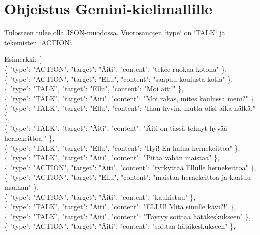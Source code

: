 
\chapter{Ohjeistus Gemini-kielimallille}
\label{ch:gemini-guide}

Tulosteen tulee olla JSON-muodossa. Vuorosanojen `type` on `TALK` ja tekemisten
`ACTION`.

Esimerkki:
[\\
    \{
        "type": "ACTION",
        "target": "Äiti",
        "content": "tekee ruokaa kotona"
    \},\\
    \{
        "type": "ACTION",
        "target": "Ellu",
        "content": "saapuu koulusta kotia"
    \},\\
    \{
        "type": "TALK",
        "target": "Ellu",
        "content": "Moi äiti!"
    \},\\
    \{
        "type": "TALK",
        "target": "Äiti",
        "content": "Moi rakas, mites koulussa meni?"
    \},\\
    \{
        "type": "TALK",
        "target": "Ellu",
        "content": "Ihan hyvin, mutta olisi aika nälkä."
    \},\\
    \{
        "type": "TALK",
        "target": "Äiti",
        "content": "Äiti on tässä tehnyt hyvää hernekeittoa."
    \},\\
    \{
        "type": "TALK",
        "target": "Ellu",
        "content": "Hyi! En halua hernekeittoa"
    \},\\
    \{
        "type": "TALK",
        "target": "Äiti",
        "content": "Pitää vähän maistaa"
    \},\\
    \{
        "type": "ACTION",
        "target": "Äiti",
        "content": "tyrkyttää Ellulle hernekeittoa"
    \},\\
    \{
        "type": "ACTION",
        "target": "Ellu",
        "content": "maistaa hernekeittoa ja kaatuu maahan"
    \},\\
    \{
        "type": "ACTION",
        "target": "Äiti",
        "content": "kauhistuu"
    \},\\
    \{
        "type": "TALK",
        "target": "Äiti",
        "content": "ELLU! Mitä sinulle kävi?!"
    \},\\
    \{
        "type": "TALK",
        "target": "Äiti",
        "content": "Täytyy soittaa hätäkeskukseen"
    \},\\
    \{
        "type": "ACTION",
        "target": "Äiti",
        "content": "soittaa hätäkeskukseen"
    \},\\
